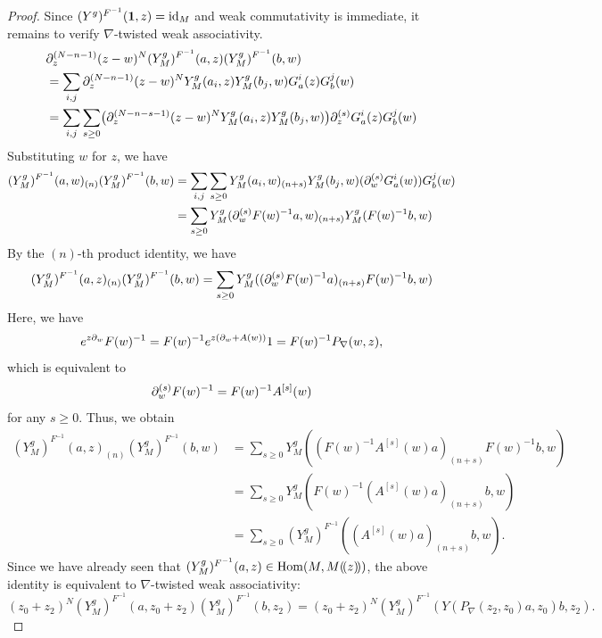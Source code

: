 \documentclass[final,reqno]{amsart}
\begin{document}
\begin{proof}
    Since $(Y^g)^{F^{-1}}(\mathbf{1},z)=\operatorname{id}_M$ and weak commutativity is immediate, it remains to verify $\nabla$-twisted weak associativity. 
    \begin{align*}
        &\partial_z^{(N-n-1)}(z-w)^N(Y^g_M)^{F^{-1}}(a,z)(Y^g_M)^{F^{-1}}(b,w)\\
        &=\sum_{i,j}\partial_z^{(N-n-1)}(z-w)^NY^g_M(a_i,z)Y^g_M(b_j,w)G^i_a(z)G^j_b(w)\\
        &=\sum_{i,j}\sum_{s\geq 0}\bigl(\partial_z^{(N-n-s-1)}(z-w)^NY^g_M(a_i,z)Y^g_M(b_j,w)\bigr)\partial_z^{(s)}G^i_a(z)G^j_b(w)
    \end{align*}
    Substituting $w$ for $z$, we have
    \begin{align*}
        (Y^g_M)^{F^{-1}}(a,w)_{(n)}(Y^g_M)^{F^{-1}}(b,w)
        &=\sum_{i,j}\sum_{s\geq 0}Y^g_M(a_i,w)_{(n+s)}Y^g_M(b_j,w)(\partial_w^{(s)}G^i_a(w))G^j_b(w)\\
        &=\sum_{s\geq 0}Y^g_M(\partial^{(s)}_wF(w)^{-1}a,w)_{(n+s)}Y^g_M(F(w)^{-1}b,w)
    \end{align*}
    By the $(n)$-th product identity, we have
    \begin{align*}
        (Y^g_M)^{F^{-1}}(a,z)_{(n)}(Y^g_M)^{F^{-1}}(b,w)
        =\sum_{s\geq 0}Y^g_M((\partial_w^{(s)}F(w)^{-1}a)_{(n+s)}F(w)^{-1}b,w)
    \end{align*}
    Here, we have
    \[
        e^{z\partial_w}F(w)^{-1}=F(w)^{-1}e^{z(\partial_w+A(w))}1=F(w)^{-1}P_{\nabla}(w,z),
    \]
    which is equivalent to 
    \[
        \partial_w^{(s)}F(w)^{-1}=F(w)^{-1}A^{[s]}(w)
    \]
    for any $s\geq 0$. Thus, we obtain
    \begin{align*}
        (Y^g_M)^{F^{-1}}(a,z)_{(n)}(Y^g_M)^{F^{-1}}(b,w)
       &=\sum_{s\geq 0}Y^g_M((F(w)^{-1}A^{[s]}(w)a)_{(n+s)}F(w)^{-1}b,w)\\
       &=\sum_{s\geq 0}Y^g_M(F(w)^{-1}(A^{[s]}(w)a)_{(n+s)}b,w)\\
       &=\sum_{s\geq 0}(Y^g_M)^{F^{-1}}((A^{[s]}(w)a)_{(n+s)}b,w).
    \end{align*}
    Since we have already seen that $(Y^g_M)^{F^{-1}}(a,z)\in\operatorname{Hom}(M,M(\!( z )\!))$, the above identity is equivalent to $\nabla$-twisted weak associativity:
    \[
        (z_0+z_2)^N(Y^g_M)^{F^{-1}}(a,z_0+z_2)(Y^g_M)^{F^{-1}}(b,z_2)=(z_0+z_2)^N(Y^g_M)^{F^{-1}}(Y(P_\nabla(z_2,z_0)a,z_0)b,z_2).
    \]
\end{proof}
\end{document}
